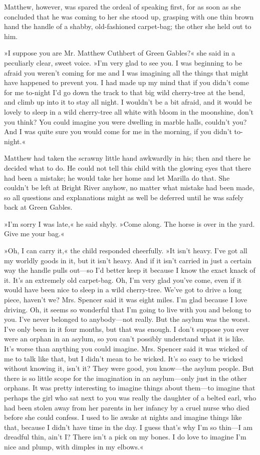 Matthew, however, was spared the ordeal of speaking first, for as soon as she concluded that he was coming to her she stood up, grasping with one thin brown hand the handle of a shabby, old-fashioned carpet-bag; the other she held out to him.

»I suppose you are Mr. Matthew Cuthbert of Green Gables?« she said in a peculiarly clear, sweet voice. »I’m very glad to see you. I was beginning to be afraid you weren’t coming for me and I was imagining all the things that might have happened to prevent you. I had made up my mind that if you didn’t come for me to-night I’d go down the track to that big wild cherry-tree at the bend, and climb up into it to stay all night. I wouldn’t be a bit afraid, and it would be lovely to sleep in a wild cherry-tree all white with bloom in the moonshine, don’t you think? You could imagine you were dwelling in marble halls, couldn’t you? And I was quite sure you would come for me in the morning, if you didn’t to-night.«

Matthew had taken the scrawny little hand awkwardly in his; then and there he decided what to do. He could not tell this child with the glowing eyes that there had been a mistake; he would take her home and let Marilla do that. She couldn’t be left at Bright River anyhow, no matter what mistake had been made, so all questions and explanations might as well be deferred until he was safely back at Green Gables.

»I’m sorry I was late,« he said shyly. »Come along. The horse is over in the yard. Give me your bag.«

»Oh, I can carry it,« the child responded cheerfully. »It isn’t heavy. I’ve got all my worldly goods in it, but it isn’t heavy. And if it isn’t carried in just a certain way the handle pulls out—so I’d better keep it because I know the exact knack of it. It’s an extremely old carpet-bag. Oh, I’m very glad you’ve come, even if it would have been nice to sleep in a wild cherry-tree. We’ve got to drive a long piece, haven’t we? Mrs. Spencer said it was eight miles. I’m glad because I love driving. Oh, it seems so wonderful that I’m going to live with you and belong to you. I’ve never belonged to anybody—not really. But the asylum was the worst. I’ve only been in it four months, but that was enough. I don’t suppose you ever were an orphan in an asylum, so you can’t possibly understand what it is like. It’s worse than anything you could imagine. Mrs. Spencer said it was wicked of me to talk like that, but I didn’t mean to be wicked. It’s so easy to be wicked without knowing it, isn’t it? They were good, you know—the asylum people. But there is so little scope for the imagination in an asylum—only just in the other orphans. It was pretty interesting to imagine things about them—to imagine that perhaps the girl who sat next to you was really the daughter of a belted earl, who had been stolen away from her parents in her infancy by a cruel nurse who died before she could confess. I used to lie awake at nights and imagine things like that, because I didn’t have time in the day. I guess that’s why I’m so thin—I am dreadful thin, ain’t I? There isn’t a pick on my bones. I do love to imagine I’m nice and plump, with dimples in my elbows.«

